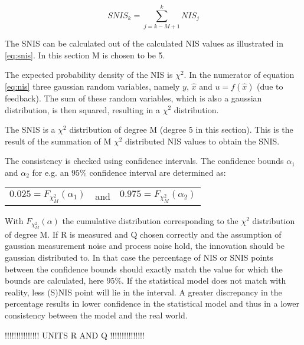 \documentclass[a4paper]{article}
\newcommand{\newpar}{\vspace{.3cm}\noindent}
\begin{document}
\begin{equation}
    SNIS_{k}=\sum_{j=k-M+1}^{k} NIS_{j}
    \label{eq:snis}
\end{equation}

\newpar
The SNIS can be calculated out of the calculated NIS values as illustrated in \autoref{eq:snis}. In this section M is chosen to be 5.

\newpar
The expected probability density of the NIS is $\chi^2$. In the numerator of equation \autoref{eq:nis} three gaussian random variables, namely $y$, $\hat{x}$ and $u=f(\hat{x})$ (due to feedback). The sum of these random variables, which is also a gaussian distribution, is then squared, resulting in a $\chi^2$ distribution.

\newpar
The SNIS is a $\chi^2$ distribution of degree M (degree 5 in this section). This is the result of the summation of M $\chi^2$ distributed NIS values to obtain the SNIS.

\newpar
The consistency is checked using confidence intervals. The confidence bounds $\alpha_{1}$ and $\alpha_{2}$ for e.g. an $95\%$ confidence interval are determined as:

\begin{center}
    \begin{tabular}{ccc}
        \(0.025 = F_{\chi^2_{M}}(\alpha_{1})\) &   and    & \(0.975 = F_{\chi^2_{M}}(\alpha_{2})\)
    \end{tabular}
\end{center}

\newpar
With \(F_{\chi^2_{M}}(\alpha)\) the cumulative distribution corresponding to the $\chi^2$ distribution of degree M. 
If R is measured and Q chosen correctly and the assumption of gaussian measurement noise and process noise hold, the innovation should be gaussian distributed to. In that case the percentage of NIS or SNIS points between the confidence bounds should exactly match the value for which the bounds are calculated, here $95\%$. If the statistical model does not match with reality, less (S)NIS point will lie in the interval. A greater discrepancy in the percentage results in lower confidence in the statistical model and thus in a lower consistency between the model and the real world.
    

\newpar
!!!!!!!!!!!!!!! UNITS R AND Q !!!!!!!!!!!!!!!
\end{document}
